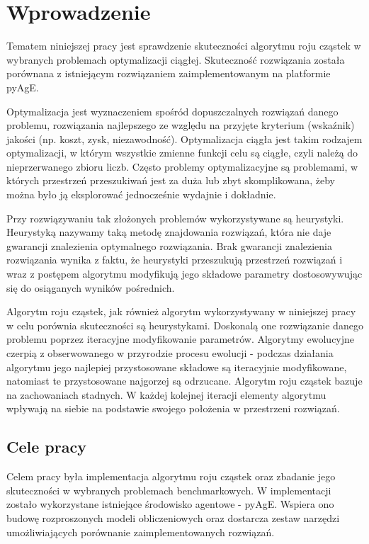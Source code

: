 \chapter{Wprowadzenie}
\label{cha:wstep}

Tematem niniejszej pracy jest sprawdzenie skuteczności algorytmu roju cząstek w wybranych problemach optymalizacji ciągłej. Skuteczność rozwiązania została porównana z istniejącym rozwiązaniem zaimplementowanym na platformie pyAgE.

Optymalizacja jest wyznaczeniem spośród dopuszczalnych rozwiązań danego problemu, rozwiązania najlepszego ze względu na przyjęte kryterium (wskaźnik) jakości (np. koszt, zysk, niezawodność). Optymalizacja ciągła jest takim rodzajem optymalizacji, w którym wszystkie zmienne funkcji celu są ciągłe, czyli należą do nieprzerwanego zbioru liczb. Często problemy optymalizacyjne są problemami, w których przestrzeń przeszukiwań jest za duża lub zbyt skomplikowana, żeby można było ją eksplorować jednocześnie wydajnie i dokładnie.

Przy rozwiązywaniu tak złożonych problemów wykorzystywane są heurystyki. Heurystyką nazywamy taką metodę znajdowania rozwiązań, która nie daje gwarancji znalezienia optymalnego rozwiązania. Brak gwarancji znalezienia rozwiązania wynika z faktu, że heurystyki przeszukują przestrzeń rozwiązań i wraz z postępem algorytmu modyfikują jego składowe parametry dostosowywując się do osiąganych wyników pośrednich.

Algorytm roju cząstek, jak również algorytm wykorzystywany w niniejszej pracy w celu porównia skuteczności są heurystykami. Doskonalą one rozwiązanie danego problemu poprzez iteracyjne modyfikowanie parametrów. Algorytmy ewolucyjne czerpią z obserwowanego w przyrodzie procesu ewolucji - podczas działania algorytmu jego najlepiej przystosowane składowe są iteracyjnie modyfikowane, natomiast te przystosowane najgorzej są odrzucane. Algorytm roju cząstek bazuje na zachowaniach stadnych. W każdej kolejnej iteracji elementy algorytmu wpływają na siebie na podstawie swojego położenia w przestrzeni rozwiązań.



\section{Cele pracy}
\label{sec:celePracy}
Celem pracy była implementacja algorytmu roju cząstek oraz zbadanie jego skuteczności w wybranych problemach benchmarkowych. W implementacji zostało wykorzystane istniejące środowisko agentowe - pyAgE. Wspiera ono budowę rozproszonych modeli obliczeniowych oraz dostarcza zestaw narzędzi umożliwiających porównanie zaimplementowanych rozwiązań.

